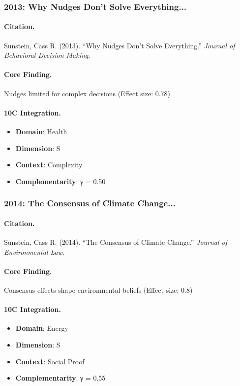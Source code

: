 \subsubsection{2013: Why Nudges Don't Solve Everything...}

\paragraph{Citation.}
Sunstein, Cass R. (2013). ``Why Nudges Don't Solve Everything.''
\textit{Journal of Behavioral Decision Making}.

\paragraph{Core Finding.}
Nudges limited for complex decisions (Effect size: 0.78)

\paragraph{10C Integration.}
\begin{itemize}[nosep]
  \item \textbf{Domain}: Health
  \item \textbf{Dimension}: S
  \item \textbf{Context}: Complexity
  \item \textbf{Complementarity}: γ = 0.50
\end{itemize}

\subsubsection{2014: The Consensus of Climate Change...}

\paragraph{Citation.}
Sunstein, Cass R. (2014). ``The Consensus of Climate Change.''
\textit{Journal of Environmental Law}.

\paragraph{Core Finding.}
Consensus effects shape environmental beliefs (Effect size: 0.8)

\paragraph{10C Integration.}
\begin{itemize}[nosep]
  \item \textbf{Domain}: Energy
  \item \textbf{Dimension}: S
  \item \textbf{Context}: Social Proof
  \item \textbf{Complementarity}: γ = 0.55
\end{itemize}

